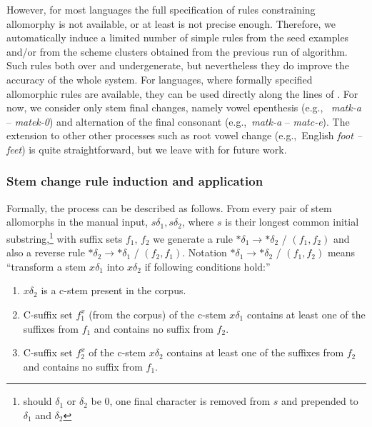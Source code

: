 \documentclass[11pt]{article}
\newcommand{\e}[1]{\textit{#1}} %
\newcommand{\eg}{e.g.,~}
\newcommand{\todoja}[1]{[\textbf{TODOJ} #1]}
\begin{document}

However, for most languages the full specification of rules constraining allomorphy is not available, or at least is not precise enough. Therefore, we automatically induce a limited number of simple rules from the seed examples and/or from the scheme clusters obtained from the previous run of algorithm. Such rules both over and undergenerate, but nevertheless they do improve the accuracy of the whole system. For languages, where formally specified allomorphic rules are available, they can be used directly along the lines of
\cite{tepper10,tepper-xia-2008}.
%
For now, we consider only stem final changes, namely vowel epenthesis (\eg
\e{matk-a} -- \e{matek-0}) and alternation of the final consonant (\eg \e{matk-a} -- \e{matc-e}). The extension to other other processes such as root vowel change (\eg English \e{foot -- feet}) is quite straightforward, but we leave with for future work.



\subsubsection{Stem change rule induction and application}

\noindent
Formally, the process can be described as follows.
From every pair of stem allomorphs in the manual input, $s\delta_1, s\delta_2$, where $s$ is their longest common initial substring,\footnote{should $\delta_1$ or $\delta_2$ be 0, one final character is removed from $s$ and prepended to $\delta_1$ and $\delta_2$} with suffix
sets $f_1$, $f_2$ we generate a rule $*\delta_1 \rightarrow *\delta_2$ / $(f_1, f_2)$ and also a reverse rule $*\delta_2 \rightarrow *\delta_1$ / $(f_2, f_1)$. Notation $*\delta_1 \rightarrow *\delta_2$ / $(f_1, f_2)$ means ``transform a stem $x\delta_1$ into $x\delta_2$ if following conditions hold:''

\begin{enumerate}
\item $x\delta_2$ is a c-stem present in the corpus.
\item C-suffix set $f^x_1$ (from the corpus) of the c-stem $x\delta_1$ contains at least one of the suffixes from $f_1$ and contains no suffix from $f_2$.
\item C-suffix set $f^x_2$ of the c-stem $x\delta_2$ contains at least one of the suffixes from $f_2$ and contains no suffix from $f_1$.
\end{enumerate}
\end{document}
